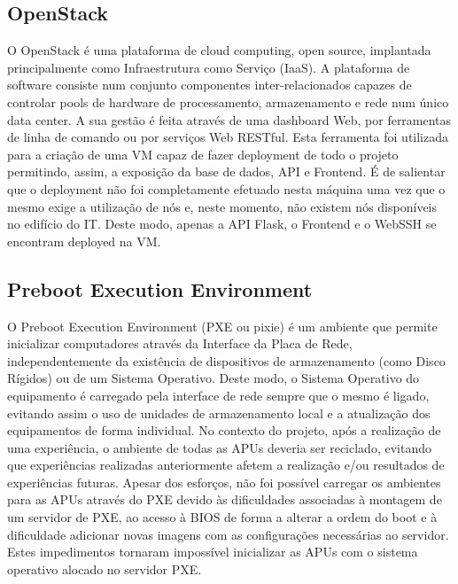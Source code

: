 \subsection{OpenStack}
O OpenStack é uma plataforma de cloud computing, open source, implantada principalmente como Infraestrutura como Serviço (IaaS). A plataforma de software consiste num conjunto componentes inter-relacionados capazes de controlar pools de hardware de processamento, armazenamento e rede num único data center. A sua gestão é feita através de uma dashboard Web, por ferramentas de linha de comando ou por serviços Web RESTful.\newline
Esta ferramenta foi utilizada para a criação de uma VM capaz de fazer deployment de todo o projeto permitindo, assim, a exposição da base de dados, API e Frontend. É de salientar que o deployment não foi completamente efetuado nesta máquina uma vez que o mesmo exige a utilização de nós e, neste momento, não existem nós disponíveis no edifício do IT. Deste modo, apenas a API Flask, o Frontend e o WebSSH se encontram deployed na VM.


\subsection{Preboot Execution Environment}
O Preboot Execution Environment (PXE ou pixie) é um ambiente que permite inicializar computadores através da Interface da Placa de Rede, independentemente da existência de dispositivos de armazenamento (como Disco Rígidos) ou de um Sistema Operativo. Deste modo, o Sistema Operativo do equipamento é carregado pela interface de rede sempre que o mesmo é ligado, evitando assim o uso de unidades de armazenamento local e a atualização dos equipamentos de forma individual.\newline
No contexto do projeto, após a realização de uma experiência, o ambiente de todas as APUs deveria ser reciclado, evitando que experiências realizadas anteriormente afetem a realização e/ou resultados de experiências futuras.\newline
Apesar dos esforços, não foi possível carregar os ambientes para as APUs através do PXE devido às dificuldades associadas à montagem de um servidor de PXE, ao acesso à BIOS de forma a alterar a ordem do boot e à dificuldade adicionar novas imagens com as configurações necessárias ao servidor. Estes impedimentos tornaram impossível inicializar as APUs com o sistema operativo alocado no servidor PXE.



